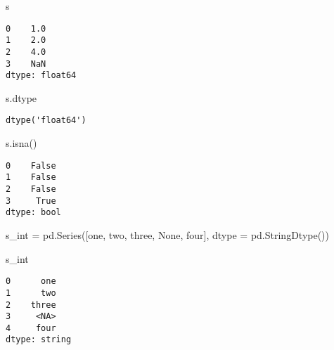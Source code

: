 \documentclass[
  letterpaper,
  DIV=11,
  numbers=noendperiod]{scrreprt}
\newenvironment{Shaded}{\begin{snugshade}}{\end{snugshade}}
\newcommand{\NormalTok}[1]{\textcolor[rgb]{0.00,0.23,0.31}{#1}}
\newcommand{\OperatorTok}[1]{\textcolor[rgb]{0.37,0.37,0.37}{#1}}
\newcommand{\StringTok}[1]{\textcolor[rgb]{0.13,0.47,0.30}{#1}}
\newcommand{\VariableTok}[1]{\textcolor[rgb]{0.07,0.07,0.07}{#1}}
\begin{document}
\begin{Shaded}
\begin{Highlighting}[]
\NormalTok{s}
\end{Highlighting}
\end{Shaded}

\begin{verbatim}
0    1.0
1    2.0
2    4.0
3    NaN
dtype: float64
\end{verbatim}

\begin{Shaded}
\begin{Highlighting}[]
\NormalTok{s.dtype}
\end{Highlighting}
\end{Shaded}

\begin{verbatim}
dtype('float64')
\end{verbatim}

\begin{Shaded}
\begin{Highlighting}[]
\NormalTok{s.isna()}
\end{Highlighting}
\end{Shaded}

\begin{verbatim}
0    False
1    False
2    False
3     True
dtype: bool
\end{verbatim}

\begin{Shaded}
\begin{Highlighting}[]
\NormalTok{s\_int }\OperatorTok{=}\NormalTok{ pd.Series([}\StringTok{\textquotesingle{}one\textquotesingle{}}\NormalTok{, }\StringTok{\textquotesingle{}two\textquotesingle{}}\NormalTok{, }\StringTok{\textquotesingle{}three\textquotesingle{}}\NormalTok{, }\VariableTok{None}\NormalTok{, }\StringTok{\textquotesingle{}four\textquotesingle{}}\NormalTok{],}
\NormalTok{                 dtype }\OperatorTok{=}\NormalTok{ pd.StringDtype())}
\end{Highlighting}
\end{Shaded}

\begin{Shaded}
\begin{Highlighting}[]
\NormalTok{s\_int}
\end{Highlighting}
\end{Shaded}

\begin{verbatim}
0      one
1      two
2    three
3     <NA>
4     four
dtype: string
\end{verbatim}
\end{document}
